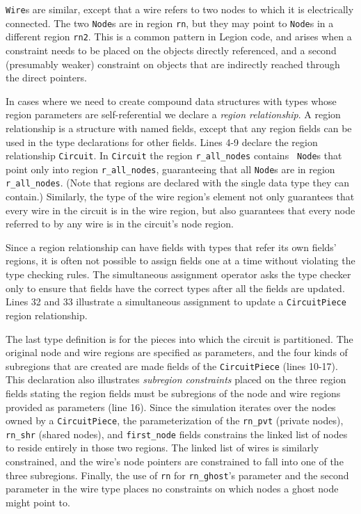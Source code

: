 {\tt Wire}s are similar, except that a wire refers to two nodes to
which it is electrically connected.  The two {\tt Node}s are in region {\tt rn},
but they may point to {\tt Node}s in a different region {\tt rn2}.  
This is a common pattern in Legion code, and
arises when a constraint needs to be placed on the objects directly
referenced, and a second (presumably weaker) constraint on objects
that are indirectly reached through the direct pointers.

In cases where we need to create compound data structures with types whose
region parameters are self-referential we declare a {\em region relationship}.
A region relationship is a structure with named fields, 
except that any region fields can be used in the type declarations
for other fields.  Lines 4-9 declare the region relationship {\tt Circuit}.
In {\tt Circuit} the region {\tt r\_all\_nodes} contains {\tt
Node}s that point only into region {\tt r\_all\_nodes}, guaranteeing that
all {\tt Node}s are in region {\tt r\_all\_nodes}.  (Note that regions are
declared with the single data type they can contain.)  Similarly, the
type of the wire region's element not only guarantees that every wire
in the circuit is in the wire region, but also guarantees that every
node referred to by any wire is in the circuit's node region.

Since a region relationship can have
fields with types that refer its own fields' regions, it is often not possible
to assign fields one at a time without violating the type checking rules.
The simultaneous assignment operator asks the type checker only to ensure
that fields have the correct types after all the fields are updated.  
Lines 32 and 33 illustrate a simultaneous
assignment to update a {\tt CircuitPiece} region relationship.

The last type definition is for the pieces into which the circuit is partitioned.
The original node and wire regions are specified as parameters, and the
four kinds of subregions that are created are made fields of the
{\tt CircuitPiece} (lines 10-17).  This declaration also illustrates {\em subregion constraints}
placed on the three region fields stating the region fields must be subregions of the 
node and wire regions provided as parameters (line 16).  Since the simulation 
iterates over the nodes owned by a {\tt CircuitPiece}, the parameterization of the {\tt rn\_pvt} (private nodes),
{\tt rn\_shr} (shared nodes), and {\tt first\_node} fields constrains the linked list of
nodes to reside entirely in those two regions.  The linked list of wires is
similarly constrained, and the wire's node pointers are constrained to fall
into one of the three subregions.
Finally,
the use of {\tt rn} for {\tt rn\_ghost}'s parameter and the second parameter
in the wire type places no constraints on which nodes a ghost node might point
to.


%

%
%
